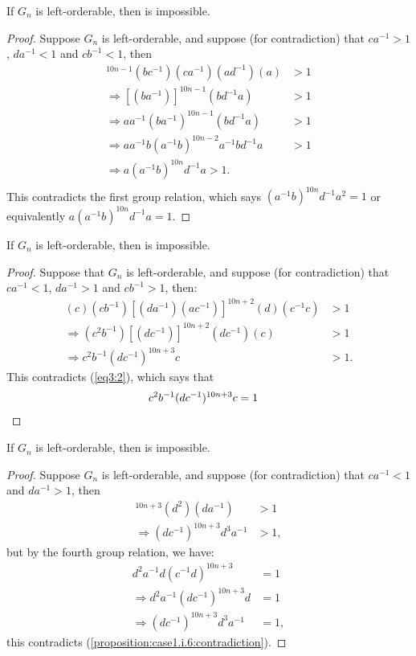 \begin{proposition} If $G_n$ is left-orderable, then  is impossible.
\end{proposition}
\begin{proof} Suppose $G_n$ is left-orderable, and suppose (for contradiction) that $ca^{-1}>1$, $da^{-1}<1$ and $cb^{-1}<1$, then
\begin{align*}
[(bc^{-1})(ca^{-1})]^{10n-1}(bc^{-1})(ca^{-1})(ad^{-1})(a)&>1\\
\Rightarrow{}[(ba^{-1})]^{10n-1}(bd^{-1}a)&>1\\
\Rightarrow{}aa^{-1}(ba^{-1})^{10n-1}(bd^{-1}a)&>1\\
\Rightarrow{}aa^{-1}b(a^{-1}b)^{10n-2}a^{-1}bd^{-1}a&>1\\
\Rightarrow{}a(a^{-1}b)^{10n}d^{-1}a>1.\\
\end{align*}
This contradicts the first group relation, which says $(a^{-1}b)^{10n}d^{-1}a^{2}=1$ or equivalently $a(a^{-1}b)^{10n}d^{-1}a=1$.
\end{proof}

\begin{proposition} If $G_n$ is left-orderable, then  is impossible.
\end{proposition}
\begin{proof} Suppose that $G_n$ is left-orderable, and suppose (for contradiction) that $ca^{-1}<1$, $da^{-1}>1$ and $cb^{-1}>1$, then:
\begin{align*}
(c)(cb^{-1})[(da^{-1})(ac^{-1})]^{10n+2}(d)(c^{-1}c)&>1\\
\Rightarrow{}(c^{2}b^{-1})[(dc^{-1})]^{10n+2}(dc^{-1})(c)&>1\\
\Rightarrow{}c^{2}b^{-1}(dc^{-1})^{10n+3}c&>1.
\end{align*}
This contradicts (\ref{eq3:2}), which says that
\begin{align*}
c^{2}b^{-1}(dc^{-1})^{10n+3}c&=1\qedhere
\end{align*}
\end{proof}

\begin{proposition} If $G_n$ is left-orderable, then  is impossible.
\end{proposition}
\begin{proof} Suppose $G_n$ is left-orderable, and suppose (for contradiction) that $ca^{-1}<1$ and $da^{-1}>1$, then
\begin{align}
[(da^{-1})(ac^{-1})]^{10n+3}(d^{2})(da^{-1})&>1\nonumber{}\\
\Rightarrow{}(dc^{-1})^{10n+3}d^{3}a^{-1}&>1,\label{proposition:case1.i.6:contradiction}
\end{align}
but by the fourth group relation, we have:
\begin{align}
d^{2}a^{-1}d(c^{-1}d)^{10n+3}&=1\nonumber{}\\
\Rightarrow{}d^{2}a^{-1}(dc^{-1})^{10n+3}d&=1\nonumber{}\\
\Rightarrow{}(dc^{-1})^{10n+3}d^{3}a^{-1}&=1,\label{eq4:2}
\end{align}
this contradicts (\ref{proposition:case1.i.6:contradiction}).
\end{proof}

